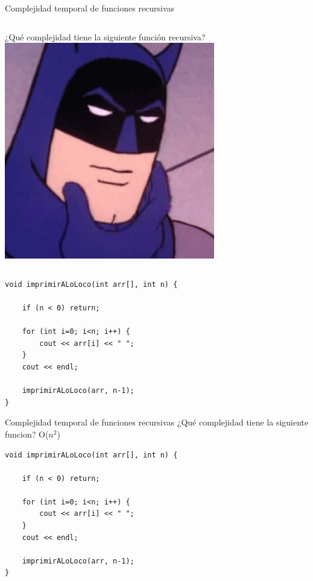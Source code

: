 \documentclass[12pt]{beamer}
\begin{document}
\begin{frame}[fragile]{Complejidad temporal de funciones recursivas}
    \begin{columns}
        ¿Qué complejidad tiene la siguiente función recursiva?
        \includegraphics[width=\textwidth]{thinking_meme2.jpg}
    \end{columns}
\begin{lstlisting}
void imprimirALoLoco(int arr[], int n) {

    if (n < 0) return;

    for (int i=0; i<n; i++) {
        cout << arr[i] << " ";
    }
    cout << endl;

    imprimirALoLoco(arr, n-1);
}
\end{lstlisting}
\end{frame}

\begin{frame}[fragile]{Complejidad temporal de funciones recursivas}
    \centering ¿Qué complejidad tiene la siguiente funcion? O(\alert{$n^2$}) \\
    \medskip
\begin{lstlisting}
void imprimirALoLoco(int arr[], int n) {
    
    if (n < 0) return;

    for (int i=0; i<n; i++) {
        cout << arr[i] << " ";
    }
    cout << endl;

    imprimirALoLoco(arr, n-1);
}
\end{lstlisting}
\end{frame}
\end{document}
